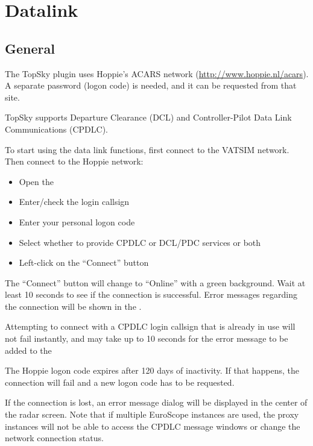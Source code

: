 \documentclass[11pt,a4paper]{memoir}
\newenvironment{Warn}
  {\begin{shaded}\marginnote{\fbox{Warning}}}
  {\end{shaded}}
\begin{document}
\chapter{Datalink}

\section{General}

The TopSky plugin uses Hoppie’s ACARS network (\url{http://www.hoppie.nl/acars}). A separate password (logon code) is needed, and it can be requested from that site. 

TopSky supports Departure Clearance (DCL) and Controller-Pilot Data Link Communications (CPDLC).

To start using the data link functions, first connect to the VATSIM network. Then connect to the Hoppie network:

\begin{itemize}
  \item Open the \textit{}
  \item Enter/check the login callsign
  \item Enter your personal logon code
  \item Select whether to provide CPDLC or DCL/PDC services or both
  \item Left-click on the “Connect” button
\end{itemize}

The “Connect” button will change to “Online” with a green background. Wait at least 10 seconds to see if the connection is successful. Error messages regarding the connection will be shown in the \textit{}. 

\begin{Warn}
  Attempting to connect with a CPDLC login callsign that is already in use will not fail instantly, and may take up to 10 seconds for the error message to be added to the \textit{}
\end{Warn}

The Hoppie logon code expires after 120 days of inactivity. If that happens, the connection will fail and a new logon code has to be requested.

If the connection is lost, an error message dialog will be displayed in the center of the radar screen. Note that if multiple EuroScope instances are used, the proxy instances will not be able to access the CPDLC message windows or change the network connection status.
\end{document}

